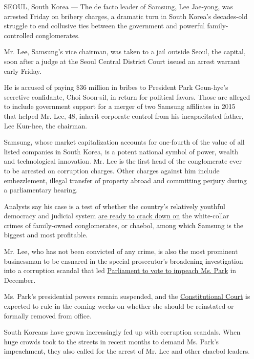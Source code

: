 SEOUL, South Korea --- The de facto leader of Samsung, Lee Jae-yong, was
arrested Friday on bribery charges, a dramatic turn in South Korea's
decades-old struggle to end collusive ties between the government and
powerful family-controlled conglomerates.

Mr. Lee, Samsung's vice chairman, was taken to a jail outside Seoul, the
capital, soon after a judge at the Seoul Central District Court issued
an arrest warrant early Friday.

He is accused of paying \$36 million in bribes to President Park
Geun-hye's secretive confidante, Choi Soon-sil, in return for political
favors. Those are alleged to include government support for a merger of
two Samsung affiliates in 2015 that helped Mr. Lee, 48, inherit
corporate control from his incapacitated father, Lee Kun-hee, the
chairman.

Samsung, whose market capitalization accounts for one-fourth of the
value of all listed companies in South Korea, is a potent national
symbol of power, wealth and technological innovation. Mr. Lee is the
first head of the conglomerate ever to be arrested on corruption
charges. Other charges against him include embezzlement, illegal
transfer of property abroad and committing perjury during a
parliamentary hearing.

Analysts say his case is a test of whether the country's relatively
youthful democracy and judicial system
\href{https://www.nytimes3xbfgragh.onion/2017/01/02/world/asia/south-korea-park-geun-hye-samsung.html?_r=0\%20//}{are
ready to crack down on} the white-collar crimes of family-owned
conglomerates, or chaebol, among which Samsung is the biggest and most
profitable.

Mr. Lee, who has not been convicted of any crime, is also the most
prominent businessman to be ensnared in the special prosecutor's
broadening investigation into a corruption scandal that led
\href{https://www.nytimes3xbfgragh.onion/2016/12/09/world/asia/south-korea-president-park-geun-hye-impeached.html}{Parliament
to vote to impeach Ms. Park} in December.

Ms. Park's presidential powers remain suspended, and the
\href{https://www.nytimes3xbfgragh.onion/2017/01/03/world/asia/south-korea-president-impeachment-trial.html}{Constitutional
Court} is expected to rule in the coming weeks on whether she should be
reinstated or formally removed from office.

South Koreans have grown increasingly fed up with corruption scandals.
When huge crowds took to the streets in recent months to demand Ms.
Park's impeachment, they also called for the arrest of Mr. Lee and other
chaebol leaders.

